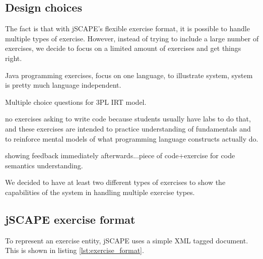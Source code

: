 \subsection{Design choices}
The fact is that with jSCAPE's flexible exercise format, it is possible to handle multiple types of exercise. However, instead of trying to include a large number of exercises, we decide to focus on a limited amount of exercises and get things right.

Java programming exercises, focus on one language, to illustrate system, system is pretty much language independent.

Multiple choice questions for 3PL IRT model.

no exercises asking to write code because students usually have labs to do that, and these exercises are intended to practice understanding of fundamentals and to reinforce mental models of what programming language constructs actually do.

showing feedback immediately afterwards...piece of code+exercise for code semantics understanding.

We decided to have at least two different types of exercises to show the capabilities of the system in handling multiple exercise types.

\subsection{jSCAPE exercise format}
To represent an exercise entity, jSCAPE uses a simple XML tagged document. This is shown in listing \ref{lst:exercise_format}.\newline



